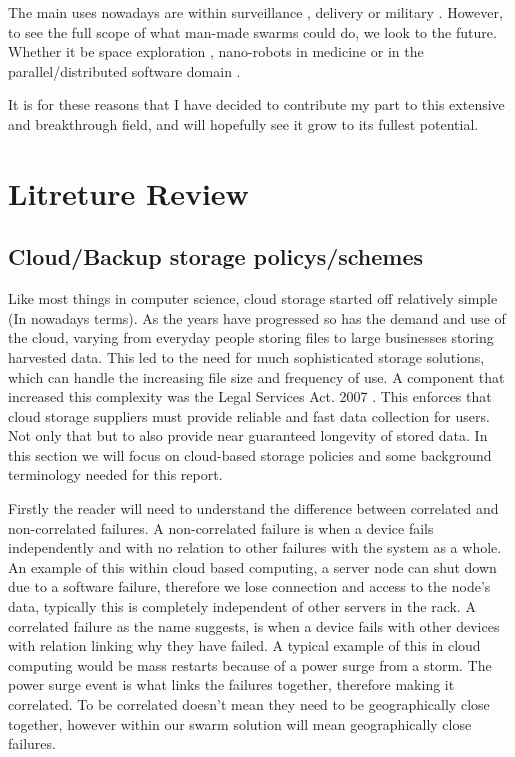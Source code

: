 \documentclass{UoYCSproject}
\begin{document}
The main uses nowadays are within surveillance \cite{UAV, HiveMind}, delivery or military \cite{Swarm robotics reviewed}.
However, to see the full scope of what man-made swarms could do, we look to the future.
Whether it be space exploration \cite{Space exploration}, nano-robots in medicine or in the parallel/distributed software domain \cite{blockchainandSwarm}.

It is for these reasons that I have decided to contribute my part to this extensive and breakthrough field, and will hopefully see it grow to its fullest potential.


\chapter{Litreture Review}
\label{cha:Litreture Review}

\section{Cloud/Backup storage policys/schemes}
\label{sec:Cloud}

Like most things in computer science, cloud storage started off relatively simple (In nowadays terms). 
As the years have progressed so has the demand and use of the cloud, varying from everyday people storing files to large businesses storing harvested data. 
This led to the need for much sophisticated storage solutions, which can handle the increasing file size and frequency of use. 
A component that increased this complexity was the Legal Services Act. 2007 \cite{LSA}. 
This enforces that cloud storage suppliers must provide reliable and fast data collection for users. 
Not only that but to also provide near guaranteed longevity of stored data.
In this section we will focus on cloud-based storage policies and some background terminology needed for this report.

Firstly the reader will need to understand the difference between correlated and non-correlated failures. 
A non-correlated failure is when a device fails independently and with no relation to other failures with the system as a whole. 
An example of this within cloud based computing, a server node can shut down due to a software failure, therefore we lose connection and access to the node’s data, typically this is completely independent of other servers in the rack. 
A correlated failure as the name suggests, is when a device fails with other devices with relation linking why they have failed. 
A typical example of this in cloud computing would be mass restarts because of a power surge from a storm. 
The power surge event is what links the failures together, therefore making it correlated. 
To be correlated doesn't mean they need to be geographically close together, however within our swarm solution will mean geographically close failures. 
\end{document}
